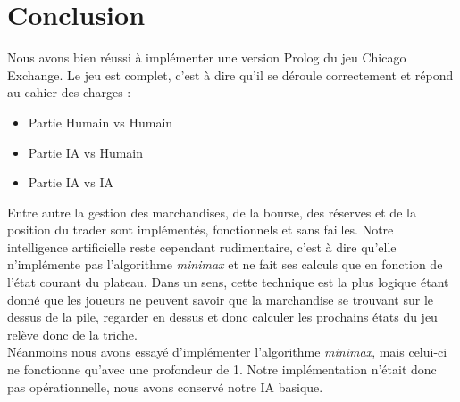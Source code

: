 \documentclass[11pt,a4paper,twoside,french,svgnames]{report}
\begin{document}
\chapter{Conclusion}
Nous avons bien réussi à implémenter une version Prolog du jeu Chicago Exchange. Le jeu est complet, c'est à dire qu'il se déroule correctement et répond au cahier des charges :
\begin{itemize}
   \item Partie Humain vs Humain
   \item Partie IA vs Humain
   \item Partie IA vs IA
\end{itemize}
Entre autre la gestion des marchandises, de la bourse, des réserves et de la position du trader sont implémentés, fonctionnels et sans failles. Notre intelligence artificielle reste cependant rudimentaire, c'est à dire qu'elle n'implémente pas l'algorithme \textit{minimax} et ne fait ses calculs que en fonction de l'état courant du plateau. Dans un sens, cette technique est la plus logique étant donné que les joueurs ne peuvent savoir que la marchandise se trouvant sur le dessus de la pile, regarder en dessus et donc calculer les prochains états du jeu relève donc de la triche.\\
Néanmoins nous avons essayé d'implémenter l'algorithme \textit{minimax}, mais celui-ci ne fonctionne qu'avec une profondeur de 1. Notre implémentation n'était donc pas opérationnelle, nous avons conservé notre IA basique.
\end{document}
